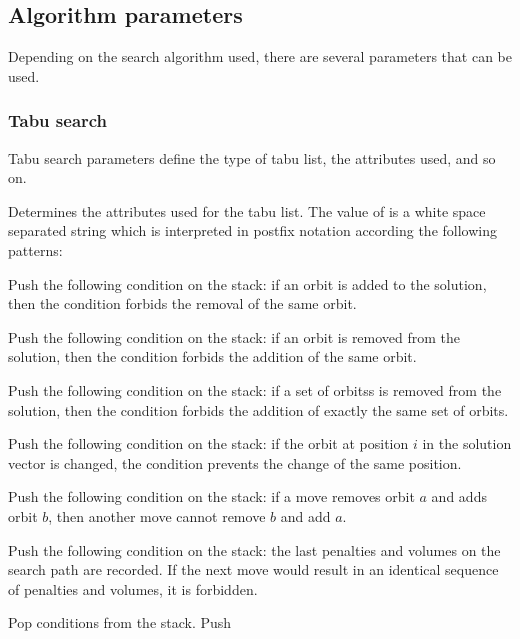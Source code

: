 \documentclass[12pt,a4paper]{article}
\begin{document}
\subsection{Algorithm parameters}

Depending on the search algorithm used, there are several parameters
that can be used.

\subsubsection{Tabu search}
\label{sec:tabu}

Tabu search parameters define the type of tabu list, the attributes
used, and so on.

\begin{owndescription}
\item[\Var{attr}] Determines the attributes used for the tabu list.
  The value of  is a white space separated string which is
  interpreted in postfix notation according the following patterns:
  \begin{owndescription}
  \item[\Var{remove}] Push the following condition on the stack: if an
    orbit is added to the solution, then the condition forbids the
    removal of the same orbit.
  \item[\Var{add}] Push the following condition on the stack: if an
    orbit is removed from the solution, then the condition forbids the
    addition of the same orbit.
  \item[\Var{addall}] Push the following condition on the stack: if a
    set of orbitss is removed from the solution, then the condition
    forbids the addition of exactly the same set of orbits.
  \item[\Var{index}] Push the following condition on the stack: if the
    orbit at position $i$ in the solution vector is changed, the
    condition prevents the change of the same position.
  \item[\Var{change}] Push the following condition on the stack: if a
    move removes orbit $a$ and adds orbit $b$, then another move
    cannot remove $b$ and add $a$.
  \item[\Val{loop} \Var{penvol}] Push the following condition on the
    stack: the last  penalties and volumes on the
    search path are recorded. If the next move would result in an
    identical sequence of penalties and volumes, it is forbidden.
  \item[\Val{n} \Var{and}] Pop  conditions from the stack. Push

\end{owndescription}
\end{owndescription}
\end{document}
